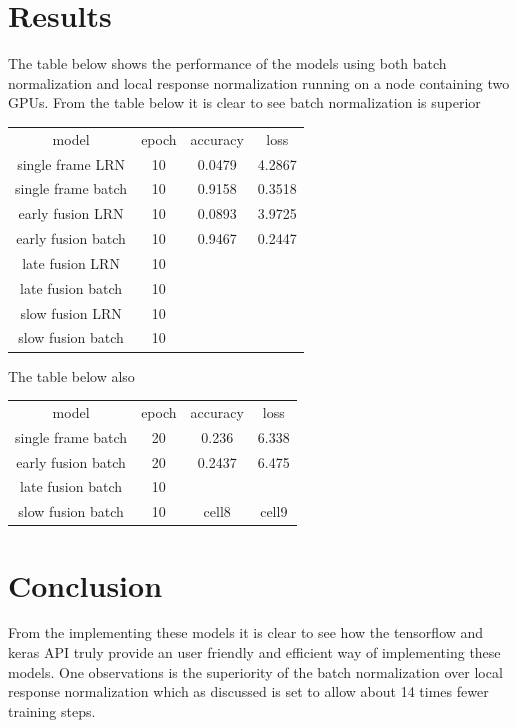 \documentclass[10pt,phd,a4paper,oneside]{article}
\begin{document}
    \section{Results}
    The table below shows the performance of the models using both batch normalization and local response normalization running on a node containing two GPUs. From the table below it is clear to see batch normalization is superior
    \begin{center}
        \begin{tabular}{ |c|c|c|c| }

            \hline
            model & epoch & accuracy & loss \\
            single frame LRN & 10 & 0.0479 & 4.2867 \\
            single frame batch  & 10 & 0.9158 & 0.3518 \\
            early fusion LRN & 10 & 0.0893 & 3.9725 \\
            early fusion batch & 10 & 0.9467 &  0.2447  \\
            late fusion LRN & 10 &  &  \\
            late fusion batch & 10 &  & \\
            slow fusion LRN & 10 &  &  \\
            slow fusion batch & 10 &  &  \\
            \hline
        \end{tabular}
        \label{lrnvsbatc}
    \end{center}

    The table below also

    \begin{center}
        \begin{tabular}{ |c|c|c|c| }
            \hline
            model & epoch &accuracy & loss \\
            single frame batch  & 20   & 0.236 & 6.338 \\
            early fusion batch  & 20 & 0.2437 &  6.475  \\
            late fusion batch   & 10 &  & \\
            slow fusion batch   & 10 & cell8 & cell9 \\
            \hline
        \end{tabular}
    \end{center}


    \section{Conclusion}
    From the implementing these models it is clear to see how the tensorflow and keras API truly provide an user friendly and efficient way of implementing these models. One observations is the superiority of the batch normalization over local response normalization which as discussed \citep{ioffe2015batch}  is set to allow about 14 times fewer training steps.


    
\end{document}
